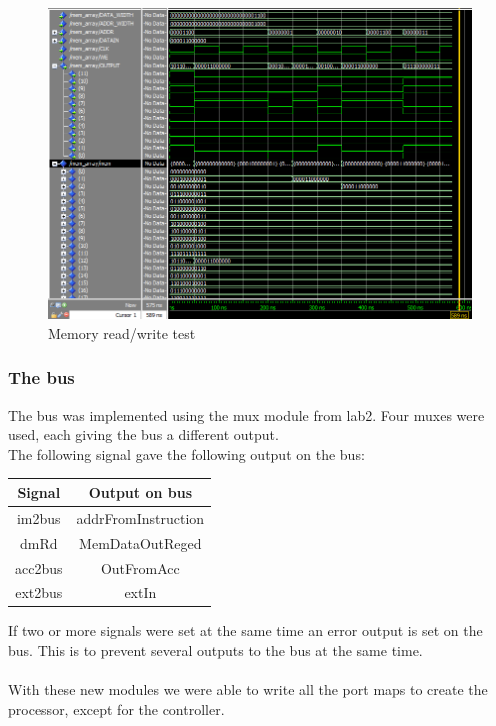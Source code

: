 \documentclass[a4paper]{article}
\begin{document}
\begin{figure}[H]
 \centering
 \includegraphics[scale=0.3]{lab3}
 \caption{Memory read/write test}
\end{figure}
			

\subsubsection{The bus}

The bus was implemented using the mux module from lab2.
Four muxes were used, each giving the bus a different output.\\

The following signal gave the following output on the bus:\\
\begin{center}
\begin{tabular} {|c|c|} \hline
Signal & Output on bus \\
\hline im2bus & addrFromInstruction\\
\hline dmRd & MemDataOutReged\\
\hline acc2bus & OutFromAcc\\
\hline ext2bus & extIn\\
\hline
\end{tabular}
\end{center}

If two or more signals were set at the same time an error output is set on the bus. This is to prevent several outputs to the bus at the same time.\\
\\
With these new modules we were able to write all the port maps to create the processor, except for the controller.
\end{document}
